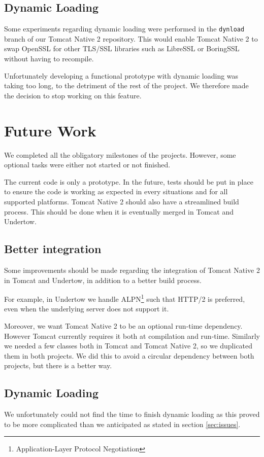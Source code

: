 \documentclass[11pt,a4paper,bibliography=totocnumbered]{scrartcl}
\def\mytitle{Tomcat Native 2}
\begin{document}
\subsection{Dynamic Loading}
Some experiments regarding dynamic loading were performed in the \texttt{dynload} branch of our \mytitle{} repository. This would enable \mytitle{} to swap OpenSSL for other TLS/SSL libraries such as LibreSSL or BoringSSL without having to recompile.

 Unfortunately developing a functional prototype with dynamic loading was taking too long, to the detriment of the rest of the project. We therefore made the decision to stop working on this feature.

\section{Future Work}
We completed all the obligatory milestones of the projects. However, some optional tasks were either not started or not finished.

The current code is only a prototype. In the future, tests should be put in place to ensure the code is working as expected in every situations and for all supported platforms. \mytitle{} should also have a streamlined build process. This should be done when it is eventually merged in Tomcat and Undertow.

\subsection{Better integration}
Some improvements should be made regarding the integration of \mytitle{} in Tomcat and Undertow, in addition to a better build process.

For example, in Undertow we handle ALPN\footnote{Application-Layer Protocol Negotiation} such that HTTP/2 is preferred, even when the underlying server does not support it.

Moreover, we want \mytitle{} to be an optional run-time dependency. However Tomcat currently requires it both at compilation and run-time. Similarly we needed a few classes both in Tomcat and \mytitle{}, so we duplicated them in both projects. We did this to avoid a circular dependency between both projects, but there is a better way.

\subsection{Dynamic Loading}
We unfortunately could not find the time to finish dynamic loading as this proved to be more complicated than we anticipated as stated in section \ref{sec:issues}.
\end{document}
